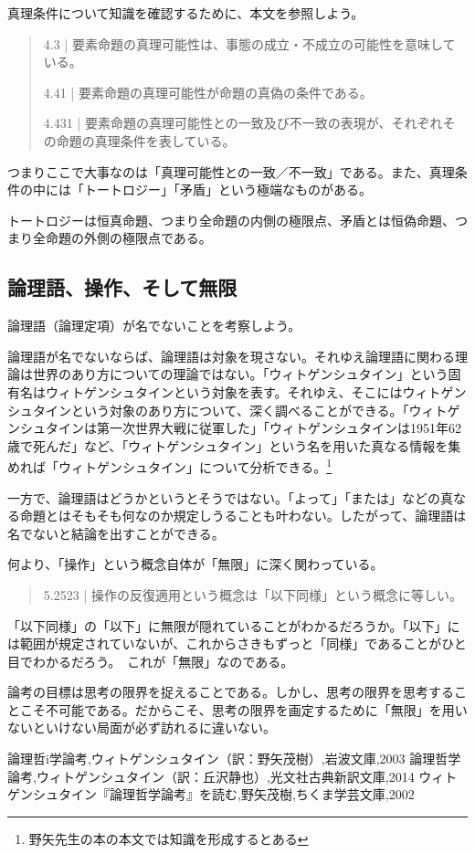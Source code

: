\documentclass[a4paper,onecolumn,openany,article]{jsarticle}
\begin{document}
真理条件について知識を確認するために、本文を参照しよう。

\begin{quote}
  4.3 | 要素命題の真理可能性は、事態の成立・不成立の可能性を意味している。

  4.41 | 要素命題の真理可能性が命題の真偽の条件である。

  4.431 | 要素命題の真理可能性との一致及び不一致の表現が、それぞれその命題の真理条件を表している。
\end{quote}

つまりここで大事なのは「真理可能性との一致／不一致」である。また、真理条件の中には「トートロジー」「矛盾」という極端なものがある。

トートロジーは恒真命題、つまり全命題の内側の極限点、矛盾とは恒偽命題、つまり全命題の外側の極限点である。

\subsection{論理語、操作、そして無限}

論理語（論理定項）が名でないことを考察しよう。

論理語が名でないならば、論理語は対象を現さない。それゆえ論理語に関わる理論は世界のあり方についての理論ではない。「ウィトゲンシュタイン」という固有名はウィトゲンシュタインという対象を表す。それゆえ、そこにはウィトゲンシュタインという対象のあり方について、深く調べることができる。「ウィトゲンシュタインは第一次世界大戦に従軍した」「ウィトゲンシュタインは1951年62歳で死んだ」など、「ウィトゲンシュタイン」という名を用いた真なる情報を集めれば「ウィトゲンシュタイン」について分析できる。\footnote{野矢先生の本の本文では知識を形成するとある}

一方で、論理語はどうかというとそうではない。「よって」「または」などの真なる命題とはそもそも何なのか規定しうることも叶わない。したがって、論理語は名でないと結論を出すことができる。

何より、「操作」という概念自体が「無限」に深く関わっている。

\begin{quote}
  5.2523 | 操作の反復適用という概念は「以下同様」という概念に等しい。
\end{quote}

「以下同様」の「以下」に無限が隠れていることがわかるだろうか。「以下」には範囲が規定されていないが、これからさきもずっと「同様」であることがひと目でわかるだろう。 これが「無限」なのである。

論考の目標は思考の限界を捉えることである。しかし、思考の限界を思考することこそ不可能である。だからこそ、思考の限界を画定するために「無限」を用いないといけない局面が必ず訪れるに違いない。

\begin{thebibliography}{9}
   論理哲i学論考,ウィトゲンシュタイン（訳：野矢茂樹）,岩波文庫,2003
   論理哲学論考,ウィトゲンシュタイン（訳：丘沢静也）,光文社古典新訳文庫,2014
   ウィトゲンシュタイン『論理哲学論考』を読む,野矢茂樹,ちくま学芸文庫,2002
\end{thebibliography}
\end{document}

